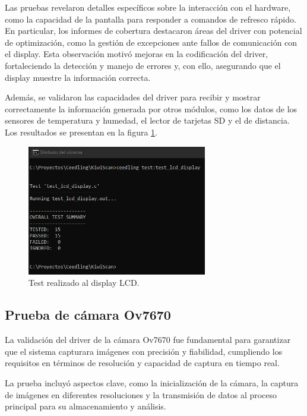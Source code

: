 Las pruebas revelaron detalles específicos sobre la interacción con el hardware, como la capacidad de la pantalla para responder a comandos de refresco rápido. En particular, los informes de cobertura destacaron áreas del driver con potencial de optimización, como la gestión de excepciones ante fallos de comunicación con el display. Esta observación motivó mejoras en la codificación del driver, fortaleciendo la detección y manejo de errores y, con ello, asegurando que el display muestre la información correcta.

Además, se validaron las capacidades del driver para recibir y mostrar correctamente la información generada por otros módulos, como los datos de los sensores de temperatura y humedad, el lector de tarjetas SD y el de distancia. Los resultados se presentan en la figura \ref{fig:test_lcd_display}.

\vspace{1cm}

\begin{figure}[htbp]
	\centering
	\includegraphics[width=0.7\textwidth, height=0.3\textheight]{./Figures/test_lcd_display.png}
	\caption{Test realizado al display LCD.}
	\label{fig:test_lcd_display}
\end{figure}

\vspace{1cm}

\subsection{Prueba de cámara Ov7670}

La validación del driver de la cámara Ov7670 fue fundamental para garantizar que el sistema capturara imágenes con precisión y fiabilidad, cumpliendo los requisitos en términos de resolución y capacidad de captura en tiempo real.

La prueba incluyó aspectos clave, como la inicialización de la cámara, la captura de imágenes en diferentes resoluciones y la transmisión de datos al proceso principal para su almacenamiento y análisis.

